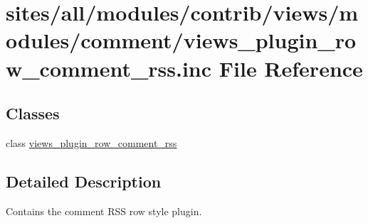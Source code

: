 \hypertarget{views__plugin__row__comment__rss_8inc}{
\section{sites/all/modules/contrib/views/modules/comment/views\_\-plugin\_\-row\_\-comment\_\-rss.inc File Reference}
\label{views__plugin__row__comment__rss_8inc}
}
\subsection*{Classes}
\begin{CompactItemize}
\item 
class \hyperlink{classviews__plugin__row__comment__rss}{views\_\-plugin\_\-row\_\-comment\_\-rss}
\end{CompactItemize}


\subsection{Detailed Description}
Contains the comment RSS row style plugin. 